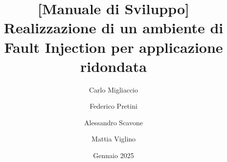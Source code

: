 \documentclass{article}
\title{\textbf{[Manuale di Sviluppo] Realizzazione di un ambiente di Fault Injection
per applicazione ridondata }}
\author{Carlo Migliaccio}
\author{Federico Pretini}
\author{Alessandro Scavone}
\author{Mattia Viglino}
\affil[1]{\small{Laurea Magistrale in Ingegneria Informatica, Politecnico di Torino}}
\date{Gennaio 2025}
\begin{document}
\renewcommand{\labelenumii}{\arabic{enumi}.\arabic{enumii}}

\maketitle
\vspace{-0.8cm}
\begin{abstract}
    \lipsum[1]
\end{abstract}
\tableofcontents



\newpage
\printbibliography
\end{document}
